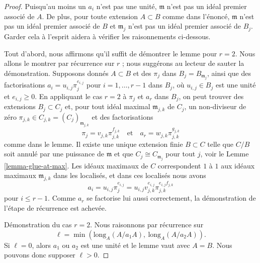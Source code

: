 \begin{proof}
Puisqu'au moins un $a_i$ n'est pas une unité, $\mathfrak m$
n'est pas un idéal premier associé de $A$. De plus, pour toute extension $A \subset B$
comme dans l'énoncé, $\mathfrak m$ n'est pas un idéal premier associé de $B$
et $\mathfrak m_j$ n'est pas un idéal premier associé de $B_j$.
Garder cela à l'esprit aidera à vérifier les raisonnements ci-dessous.

\medskip\noindent
Tout d'abord, nous affirmons qu'il suffit de démontrer le lemme pour $r = 2$.
Nous allons le montrer par récurrence sur $r$ ; nous suggérons au lecteur
de sauter la démonstration. Supposons donnés $A \subset B$ et des $\pi_j$ dans
$B_j = B_{\mathfrak m_j}$, ainsi que des factorisations
$a_i = u_{i, j} \pi_j^{e_{i, j}}$ pour $i = 1, \ldots, r - 1$ dans $B_j$,
où $u_{i, j} \in B_j$ est une unité et $e_{i, j} \geq 0$.
En appliquant le cas $r = 2$ à $\pi_j$ et $a_r$ dans $B_j$,
on peut trouver des extensions $B_j \subset C_j$ et, pour tout idéal maximal
$\mathfrak m_{j, k}$ de $C_j$, un non-diviseur de zéro
$\pi_{j, k} \in C_{j, k} = (C_j)_{\mathfrak m_{j, k}}$
et des factorisations
$$
\pi_j = v_{j, k} \pi_{j, k}^{f_{j, k}}
\quad\text{et}\quad
a_r = w_{j, k} \pi_{j, k}^{g_{j, k}}
$$
comme dans le lemme. Il existe une unique extension finie $B \subset C$
telle que $C/B$ soit annulé par une puissance de $\mathfrak m$ et
que $C_j \cong C_{\mathfrak m_j}$ pour tout $j$, voir
le Lemme \ref{lemma-glue-at-max}.
Les idéaux maximaux de $C$ correspondent $1$ à $1$
aux idéaux maximaux $\mathfrak m_{j, k}$ dans les localisés,
et dans ces localisés nous avons
$$
a_i = u_{i, j} \pi_j^{e_{i, j}} =
u_{i, j} v_{j, k}^{e_{i, j}} \pi_{j, k}^{e_{i, j}f_{j, k}}
$$
pour $i \leq r - 1$. Comme $a_r$ se factorise lui aussi correctement, la
démonstration de l'étape de récurrence est achevée.

\medskip\noindent
Démonstration du cas $r = 2$. Nous raisonnons par récurrence sur
$$
\ell = \min(\text{long}_A(A/a_1A),\ \text{long}_A(A/a_2A)).
$$
Si $\ell = 0$, alors $a_1$ ou $a_2$ est une unité et
le lemme vaut avec $A = B$. Nous pouvons donc supposer $\ell > 0$.


\end{proof}
